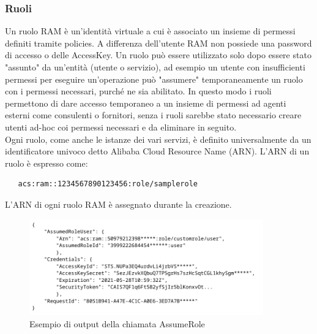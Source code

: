 \documentclass[a4paper]{article}
\begin{document}
\subsubsection{Ruoli}
Un ruolo RAM è un'identità virtuale a cui è associato un insieme di permessi definiti tramite policies. A differenza dell'utente RAM non possiede una password di accesso o delle AccessKey. Un ruolo può essere utilizzato solo dopo essere stato "assunto" da un'entità (utente o servizio), ad esempio un utente con insufficienti permessi per eseguire un'operazione può "assumere" temporaneamente un ruolo con i permessi necessari, purché ne sia abilitato. In questo modo i ruoli permettono di dare accesso temporaneo a un insieme di permessi ad agenti esterni come consulenti o fornitori, senza i ruoli sarebbe stato necessario creare utenti ad-hoc coi permessi necessari e da eliminare in seguito.\\
Ogni ruolo, come anche le istanze dei vari servizi, è definito universalmente da un identificatore univoco detto Alibaba Cloud Resource Name (ARN). L'ARN di un ruolo è espresso come:
\vskip 0.3cm
\begin{lstlisting}
   acs:ram::1234567890123456:role/samplerole
\end{lstlisting}
\vskip 0.3cm
L'ARN di ogni ruolo RAM è assegnato durante la creazione.\cite{alibaba_roles}
\begin{figure}[ht]
    \centering
    \includegraphics[width=0.9\textwidth]{Risorse/role.png}
    \caption{Esempio di output della chiamata AssumeRole}
\end{figure}\\

\end{document}
